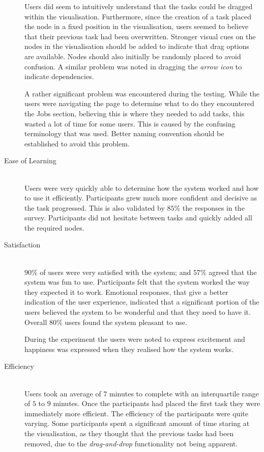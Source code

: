 \documentclass[12pt,a4paper]{report}
\begin{document}
\begin{description}
    Users did seem to intuitively understand that the tasks could be dragged
    within
    the visualisation. Furthermore, since the creation of a task placed the node
    in a fixed position in the visualisation, users seemed to believe that their previous task
    had been overwritten. Stronger visual cues on the nodes in the visualisation
    should be added to indicate that drag options are available. Nodes should
    also initially be randomly placed to avoid confusion. A similar problem was
    noted in dragging the \emph{arrow icon} to indicate dependencies.
    
    A rather significant problem was encountered during the testing. While
    the users were navigating the page to determine what to do they encountered
    the Jobs section, believing this is where they needed to add tasks, this
    wasted a lot of time for some users. This is caused by the confusing
    terminology that was used. Better naming convention should be established to avoid
    this problem.
\item[Ease of Learning] \hfill \\
    Users were very quickly able to determine how the system worked and how to
    use it efficiently. Participants grew much more confident and decisive as
    the task progressed. This is also validated by $85\%$ the responses in
    the survey.
    Participants did not hesitate between tasks and quickly added all the
    required nodes. 
\item[Satisfaction] \hfill \\
    $90\%$ of users were very satisfied with the system; and $57\%$ agreed
    that the  system was fun to use.
    Participants felt that the system worked the way
    they expected it to work. Emotional responses, that give a better indication of the user
    experience, indicated that a significant portion of the users believed the
    system to be wonderful and that they need to have it. Overall $80\%$ 
    users found
    the system pleasant to use.
    
    During the experiment the users were noted to express excitement and
    happiness was expressed when they realised how the system works. 


\item[Efficiency] \hfill \\
    Users took an average of $7$ minutes to complete with an interquartile range
    of $5$ to $9$ minutes. Once the participants had placed the first task they
    were immediately more efficient. The efficiency of the participants were
    quite varying. Some participants spent a significant amount of time
    staring at the visualisation, as they thought that the previous tasks had
    been removed, due to the \emph{drag-and-drop} functionality not being
    apparent.
\end{description}
\end{document}
